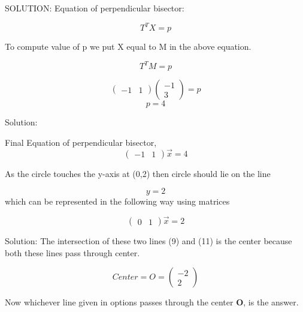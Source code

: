 \documentclass{beamer}
\newcommand{\myvec}[1]{\ensuremath{\begin{pmatrix}#1\end{pmatrix}}}
\begin{document}
\begin{frame}{SOLUTION:}
Equation of perpendicular bisector:\newline

\begin{equation}
    T^T X = p
\end{equation}

To compute value of p we put X equal to M in the above equation.
\newline

\begin{equation}
    T^T M = p
\end{equation}

\begin{equation}
        \myvec{-1&1}\myvec{-1\\3}=p
\end{equation}
\begin{equation}
    p=4
\end{equation}

\end{frame}

\begin{frame}{Solution: }

Final Equation of perpendicular bisector,
\begin{equation}
        \myvec{-1&1}\vec{x} = 4 
\end{equation}

As the circle touches the y-axis at (0,2) then circle should lie on the line

\begin{equation}
        y=2
\end{equation}
which can be represented in the following way using matrices

\begin{equation}
        \myvec{0&1} \vec{x} = 2
\end{equation}


\end{frame}

\begin{frame}{Solution: }
    The intersection of these two lines (9) and (11) is the center because both these lines pass through center.\newline
    
\begin{equation}
        Center= O =\myvec{-2\\2}
\end{equation}

Now whichever line given in options passes through the center \textbf{O}, is the answer. 
\end{frame}
\end{document}
